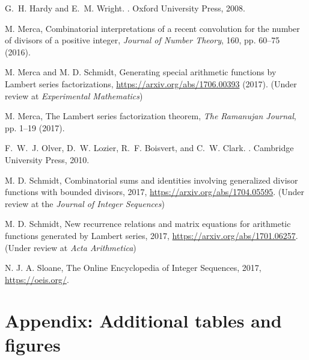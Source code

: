 \documentclass[10pt,reqno]{amsart}
\numberwithin{figure}{section}
\numberwithin{table}{section}
\theoremstyle{plain}
\numberwithin{theorem}{section}
\theoremstyle{remark}
\begin{document}
\begin{thebibliography}{10} 

G.~H. Hardy and E.~M. Wright.
.
\newblock Oxford University Press, 2008.

M. Merca, {Combinatorial interpretations of a recent convolution for the number of divisors of a positive integer}, 
{\it Journal of Number Theory}, 160, pp. 60--75 (2016).

M. Merca and M. D. Schmidt, {Generating special arithmetic functions by 
  Lambert series factorizations}, \url{https://arxiv.org/abs/1706.00393} (2017). 
  (Under review at \textit{Experimental Mathematics}) 

M. Merca, {The {L}ambert series factorization theorem}, 
  {\it The Ramanujan Journal}, pp. 1--19 (2017). 

F.~W.~J. Olver, D.~W. Lozier, R.~F. Boisvert, and C.~W. Clark.
.
\newblock Cambridge University Press, 2010.

M. D. Schmidt, {Combinatorial sums and identities involving generalized 
  divisor functions with bounded divisors}, 2017, 
  \url{https://arxiv.org/abs/1704.05595}. 
  (Under review at the \textit{Journal of Integer Sequences})

M. D. Schmidt, {New recurrence relations and matrix equations for arithmetic 
  functions generated by {L}ambert series}, 2017, 
  \url{https://arxiv.org/abs/1701.06257}. 
  (Under review at \textit{Acta Arithmetica})
  
N. J. A. Sloane, {The Online Encyclopedia of Integer Sequences}, 2017, 
  \url{https://oeis.org/}. 

\end{thebibliography} 

\newpage 

\section{Appendix: Additional tables and figures} 
\label{AppendixA_Tables_Figures} 
\end{document}
